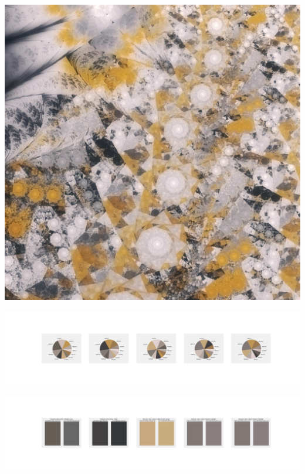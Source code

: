 \documentclass[11pt]{article}
\begin{document}
\begin{landscape}
    \begin{center}
    \includegraphics[width=\textwidth]{./nbimg/file (375).jpg}
    \end{center}

    \begin{center}
    \includegraphics[width=250mm]{./nbimg/pie-306.jpg}
    \end{center}

    \begin{center}
    \includegraphics[width=250mm]{./nbimg/peak-306.jpg}
    \end{center}
    


\end{landscape}
\end{document}
